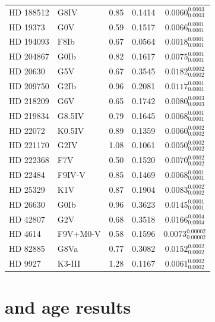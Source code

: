 \begin{appendices}
\begin{longtable}{llccc}
HD 188512         & G8IV          & 0.85 & 0.1414        & $0.0060^{0.0003}_{0.0003}$ \\
HD 19373          & G0V           & 0.59 & 0.1517        & $0.0066^{0.0001}_{0.0001}$ \\
HD 194093         & F8Ib          & 0.67 & 0.0564        & $0.0018^{0.0001}_{0.0001}$ \\
HD 204867         & G0Ib          & 0.82 & 0.1617        & $0.0075^{0.0001}_{0.0001}$ \\
HD 20630          & G5V           & 0.67 & 0.3545        & $0.0182^{0.0002}_{0.0002}$ \\
HD 209750         & G2Ib          & 0.96 & 0.2081        & $0.0117^{0.0001}_{0.0001}$ \\
HD 218209         & G6V           & 0.65 & 0.1742        & $0.0080^{0.0003}_{0.0003}$ \\
HD 219834         & G8.5IV        & 0.79 & 0.1645        & $0.0068^{0.0001}_{0.0001}$ \\
HD 22072          & K0.5IV        & 0.89 & 0.1359        & $0.0060^{0.0002}_{0.0002}$ \\
HD 221170         & G2IV          & 1.08 & 0.1061        & $0.0050^{0.0002}_{0.0002}$ \\
HD 222368         & F7V           & 0.50 & 0.1520        & $0.0070^{0.0002}_{0.0002}$ \\
HD 22484          & F9IV-V        & 0.85 & 0.1469        & $0.0068^{0.0001}_{0.0001}$ \\
HD 25329          & K1V           & 0.87 & 0.1904        & $0.0083^{0.0002}_{0.0002}$ \\
HD 26630          & G0Ib          & 0.96 & 0.3623        & $0.0145^{0.0001}_{0.0001}$ \\
HD 42807          & G2V           & 0.68 & 0.3518        & $0.0166^{0.0004}_{0.0004}$ \\
HD 4614           & F9V+M0-V      & 0.58 & 0.1596        & $0.0073^{0.00002}_{0.00002}$ \\
HD 82885          & G8Va          & 0.77 & 0.3082        & $0.0152^{0.0002}_{0.0002}$ \\
HD 9927           & K3-III        & 1.28 & 0.1167        & $0.0061^{0.0002}_{0.0002}$ \\

\end{longtable}

\clearpage
\newpage

\chapter{\texorpdfstring{\Rprime}{Rprime} and age results}
\label{App_calcium_results}


\end{appendices}
